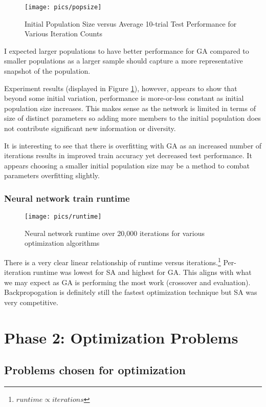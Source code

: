 \documentclass[12pt]{article}
\begin{document}
\begin{figure}[h!]
    \texttt{[image: pics/popsize]}
    \caption{Initial Population Size versus Average 10-trial Test Performance for Various Iteration Counts}
    \label{fig:popsize}
\end{figure}

I expected larger populations to have better performance for GA compared to smaller populations as a larger sample should capture a more representative snapshot of the population. 

Experiment results (displayed in Figure \ref{fig:popsize}), however, appears to show that beyond some initial variation, performance is more-or-less constant as initial population size increases. This makes sense as the network is limited in terms of size of distinct parameters so adding more members to the initial population does not contribute significant new information or diversity.

It is interesting to see that there is overfitting with GA as an increased number of iterations results in improved train accuracy yet decreased test performance. It appears choosing a smaller initial population size may be a method to combat parameters overfitting slightly.



\subsubsection{Neural network train runtime}

\begin{figure}[h!]
    \texttt{[image: pics/runtime]}
    \caption{Neural network runtime over 20,000 iterations for various optimization algorithms}
\end{figure}

There is a very clear linear relationship of runtime versus iterations.\footnote{$runtime \propto iterations$} Per-iteration runtime was lowest for SA and highest for GA. This aligns with what we may expect as GA is performing the most work (crossover and evaluation). Backpropogation is definitely still the fastest optimization technique but SA was very competitive.




\section{Phase 2: Optimization Problems}
\subsection{Problems chosen for optimization}
\end{document}
